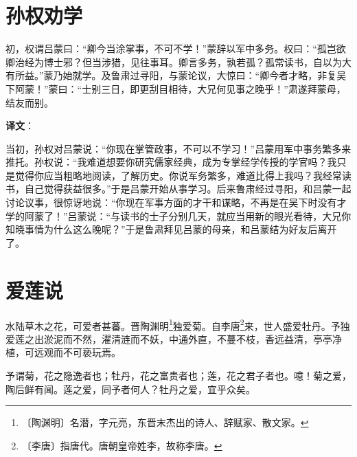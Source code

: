 \documentclass[12pt,UTF-8,openany]{ctexbook}
\begin{document}
\chapter{孙权劝学}

\begin{normalsize}
    
    初，权谓吕蒙曰：“卿今当涂掌事，不可不学！”蒙辞以军中多务。权曰：“孤岂欲卿治经为博士邪？但当涉猎，见往事耳。卿言多务，孰若孤？孤常读书，自以为大有所益。”蒙乃始就学。及鲁肃过寻阳，与蒙论议，大惊曰：“卿今者才略，非复吴下阿蒙！”蒙曰：“士别三日，即更刮目相待，大兄何见事之晚乎！”肃遂拜蒙母，结友而别。
\end{normalsize}


\newpage

\textbf{译文}：

\vspace{1em}

\begin{normalsize}
    
    当初，孙权对吕蒙说：“你现在掌管政事，不可以不学习！”吕蒙用军中事务繁多来推托。孙权说：“我难道想要你研究儒家经典，成为专掌经学传授的学官吗？我只是觉得你应当粗略地阅读，了解历史。你说军务繁多，难道比得上我吗？我经常读书，自己觉得获益很多。”于是吕蒙开始从事学习。后来鲁肃经过寻阳，和吕蒙一起讨论议事，很惊讶地说：“你现在军事方面的才干和谋略，不再是在吴下时没有才学的阿蒙了！”吕蒙说：“与读书的士子分别几天，就应当用新的眼光看待，大兄你知晓事情为什么这么晚呢？”于是鲁肃拜见吕蒙的母亲，和吕蒙结为好友后离开了。
    
\end{normalsize}



\chapter{爱莲说}

\begin{normalsize}
    
    水陆草木之花，可爱者甚蕃。晋陶渊明\footnote{〔陶渊明〕名潜，字元亮，东晋末杰出的诗人、辞赋家、散文家。}独爱菊。自李唐\footnote{〔李唐〕指唐代。唐朝皇帝姓李，故称李唐。}来，世人盛爱牡丹。予独爱莲之出淤泥而不然，濯清涟而不妖，中通外直，不蔓不枝，香远益清，亭亭净植，可远观而不可亵玩焉。
    
    予谓菊，花之隐逸者也；牡丹，花之富贵者也；莲，花之君子者也。噫！菊之爱，陶后鲜有闻。莲之爱，同予者何人？牡丹之爱，宜乎众矣。
\end{normalsize}
\end{document}

